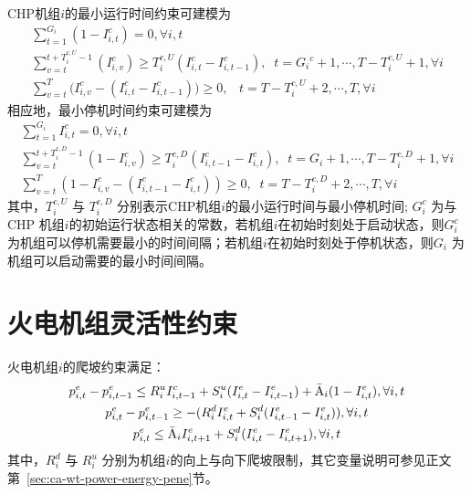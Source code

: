 CHP机组$i$的最小运行时间约束可建模为~\cite{UC-Model-06,IES-Model-CXY-18}
\begin{subequations}
\begin{gather}
\sum\limits_{t = 1}^{{G_i}} {(1 - I_{i,t}^c) = 0}, \forall i,t  \\
\sum\limits_{v = t}^{t + T_i^{c,U} - 1} {(I_{i,v}^c)} \ge T_i^{c,U}(I_{i,t}^c - I_{i,t - 1}^c), \;\;t = {G_i}^c + 1,\cdots,T - T_i^{c,U} + 1, \forall i\\
\sum\limits_{v = t}^T {(I_{i,v}^c - (I_{i,t}^c - I_{i,t-1}^c)} ) \ge 0, \;\;\;t = T - T_i^{c,U} + 2,\cdots,T, \forall i
\end{gather}
\end{subequations}
相应地，最小停机时间约束可建模为~\cite{UC-Model-06,IES-Model-CXY-18}
\begin{subequations}
\begin{gather}
\sum\limits_{t = 1}^{{G_i}} {I_{i,t}^c = 0}, \forall i,t \\
\sum\limits_{v = t}^{t + T_i^{c,D} - 1} {(1 - I_{i,v}^c)}  \ge T_i^{c,D}(I_{i,t - 1}^c-I_{i,t}^c), \;\;t = {G_i} + 1,\cdots,T - T_i^{c,D} + 1, \forall i\\
\sum\limits_{v = t}^T {(1 - I_{i,v}^c - (I_{i,t - 1}^c - I_{i,t}^c))}  \ge 0, \;\;t = T - T_i^{c,D} + 2,\cdots,T, \forall i
\end{gather}
\end{subequations}
其中，$T_i^{c,U}$ 与 $T_i^{c,D}$ 分别表示CHP机组$i$的最小运行时间与最小停机时间; ${G_i^c}$ 为与CHP 机组$i$的初始运行状态相关的常数，若机组$i$在初始时刻处于启动状态，则${G_i^c}$ 为机组可以停机需要最小的时间间隔；若机组$i$在初始时刻处于停机状态，则${G_i}$  为机组可以启动需要的最小时间间隔。

\section{火电机组灵活性约束}
火电机组$i$的爬坡约束满足\cite{UC-Model-06, CHP-Model-CXY-15, IES-Model-CXY-18}：
\begin{subequations}
\begin{gather}
p_{i,t}^e - p_{i,t - 1}^e \le R_i^uI_{i,t - 1}^c + S_i^u(I_{i,t}^e - I_{i,t - 1}^e) + {{\bar {\rm A}}_i}(1 - I_{i,t}^e), \forall i,t \\
p_{i,t}^e - p_{i,t - 1}^e \ge  - (R_i^dI_{i,t}^e + S_i^d(I_{i,t - 1}^e - I_{i,t}^e)), \forall i,t \\
p_{i,t}^e \le {{\bar {\rm A}}_i}I_{i,t + 1}^e + S_i^d(I_{i,t}^e - I_{i,t + 1}^e), \forall i,t
\end{gather}
\end{subequations}
其中，$R_i^d$ 与 $R_i^u$ 分别为机组$i$的向上与向下爬坡限制，其它变量说明可参见正文第~\ref{sec:ca-wt-power-energy-pene}节。

